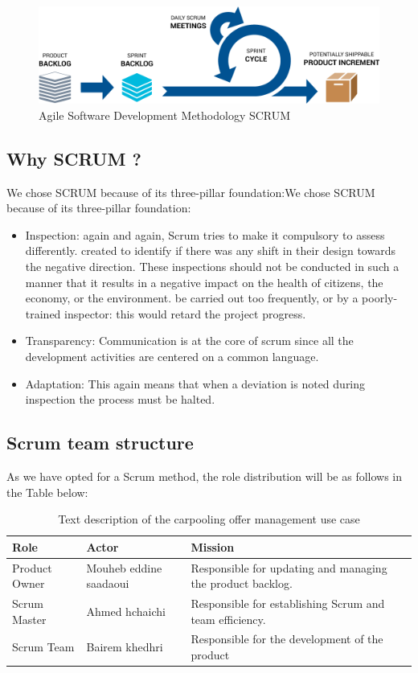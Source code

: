 \begin{figure}[H] 
            \centering
            \includegraphics[scale=0.45]{agile.png}
            \caption{Agile Software Development Methodology SCRUM} 
            \label{fig: Agile Software Development Methodology SCRUM}
\end{figure}
\subsection{Why SCRUM ?}
We chose SCRUM because of its three-pillar foundation:We chose SCRUM because of its three-pillar foundation:
\begin{itemize}
    \item Inspection: again and again, Scrum tries to make it compulsory to assess differently. created to identify if there was any shift in their design towards the negative direction. These inspections should not be conducted in such a manner that it results in a negative impact on the health of citizens, the economy, or the environment.
    be carried out too frequently, or by a poorly-trained inspector: this would retard the project progress.
    \item Transparency: Communication is at the core of scrum since all the development activities are centered on a common language.
    \item Adaptation: This again means that when a deviation is noted during inspection the process must be halted.
\end{itemize}
\subsection{Scrum team structure}
As we have opted for a Scrum method, the role distribution will be as 
follows in the Table below:
\begin{table}[h]
    \centering
    \begin{tabular}{|p{3cm}|p{4cm}|p{8cm}|}
        \hline
        Role & Actor & Mission\\
        \hline
        Product Owner & Mouheb eddine saadaoui & Responsible for updating and managing the product backlog. \\
        \hline
        Scrum Master & Ahmed hchaichi & Responsible for establishing Scrum and team efficiency. \\
        \hline
        Scrum Team & Bairem khedhri & Responsible for the development of the product \\
        \hline
    \end{tabular}
    \caption{Text description of the carpooling offer management use case}
    \label{Tab: Text description of the carpooling offer management use case}
\end{table}


